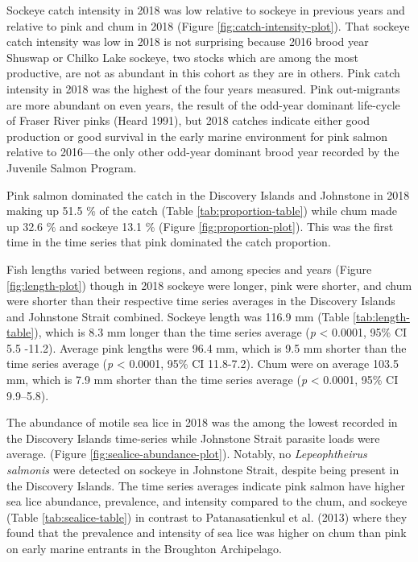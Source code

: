 \documentclass[fleqn,10pt]{wlpeerj} %
\begin{document}
Sockeye catch intensity in 2018 was low relative to sockeye in previous years and relative to pink and chum in 2018 (Figure \ref{fig:catch-intensity-plot}). That sockeye catch intensity was low in 2018 is not surprising because 2016 brood year Shuswap or Chilko Lake sockeye, two stocks which are among the most productive, are not as abundant in this cohort as they are in others. Pink catch intensity in 2018 was the highest of the four years measured. Pink out-migrants are more abundant on even years, the result of the odd-year dominant life-cycle of Fraser River pinks (Heard 1991), but 2018 catches indicate either good production or good survival in the early marine environment for pink salmon relative to 2016---the only other odd-year dominant brood year recorded by the Juvenile Salmon Program.

Pink salmon dominated the catch in the Discovery Islands and Johnstone in 2018 making up 51.5 \% of the catch (Table \ref{tab:proportion-table}) while chum made up 32.6 \% and sockeye 13.1 \% (Figure \ref{fig:proportion-plot}). This was the first time in the time series that pink dominated the catch proportion.

Fish lengths varied between regions, and among species and years (Figure \ref{fig:length-plot}) though in 2018 sockeye were longer, pink were shorter, and chum were shorter than their respective time series averages in the Discovery Islands and Johnstone Strait combined. Sockeye length was 116.9 mm (Table \ref{tab:length-table}), which is 8.3 mm longer than the time series average (\emph{p} \textless{} 0.0001, 95\% CI 5.5 -11.2). Average pink lengths were 96.4 mm, which is 9.5 mm shorter than the time series average (\emph{p} \textless{} 0.0001, 95\% CI 11.8-7.2). Chum were on average 103.5 mm, which is 7.9 mm shorter than the time series average (\emph{p} \textless{} 0.0001, 95\% CI 9.9--5.8).

The abundance of motile sea lice in 2018 was the among the lowest recorded in the Discovery Islands time-series while Johnstone Strait parasite loads were average. (Figure \ref{fig:sealice-abundance-plot}). Notably, no \emph{Lepeophtheirus salmonis} were detected on sockeye in Johnstone Strait, despite being present in the Discovery Islands. The time series averages indicate pink salmon have higher sea lice abundance, prevalence, and intensity compared to the chum, and sockeye (Table \ref{tab:sealice-table}) in contrast to Patanasatienkul et al. (2013) where they found that the prevalence and intensity of sea lice was higher on chum than pink on early marine entrants in the Broughton Archipelago.
\end{document}
